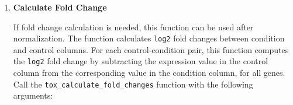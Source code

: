 \documentclass[11pt]{article}
\begin{document}
\begin{enumerate}
\begin{enumerate}
	      	      \begin{itemize}
	      	      	\item \texttt{df\_matrix}: A numeric matrix with genes as rows and tissues
	      	      	      as columns
	      	      	      
	      	      	\item (Optional) \texttt{remove\_all\_zero\_genes}: Logical, whether
	      	      	      to remove genes that are all zeros (default = TRUE)
	      	      	      
	      	      	\item (Optional) \texttt{na\_strategy}: Strategy for handling NA values:
	      	      	      "remove\_genes", "remove\_samples", "impute\_zero", "impute\_mean"
	      	      	      (default = "remove\_genes"
	      	      	      
	      	      	\item (Optional) \texttt{min\_expression\_threshold}: Minimum expression
	      	      	      value to consider (values below this become 0 and default is 0)
	      	      	      
	      	      	\item (Optional) \texttt{convert\_small\_to\_zero}: Logical, wheter
	      	      	      very small numbers should be converted to zero (default = FALSE)
	      	      \end{itemize}
	      	      
	      	      \textbf{Returns:}
	      	      \begin{itemize}
	      	      	\item A cleaned matrix ready for normalization
	      	      \end{itemize}
	      	      
	      	      \begin{lstlisting}[language=R, caption={R Clean Data for Normalization}]
tox_clean_data_for_normalization(df_matrix, remove_all_zero_genes, 
    na_strategy, min_expression_threshold, convert_small_to_zero)
	      	      \end{lstlisting}
	      \end{enumerate}
	      
	\item \textbf{Calculate Fold Change}
	      
	      If fold change calculation is needed, this function can be used after
	      normalization. The function calculates \texttt{log2} fold changes between
	      condition and control columns. For each control-condition pair, this
	      function computes the \texttt{log2} fold change by subtracting the expression
	      value in the control column from the corresponding value in the condition column,
	      for all genes. Call the \texttt{tox\_calculate\_fold\_changes} function
	      with the following arguments:
	      

\end{enumerate}
\end{document}
